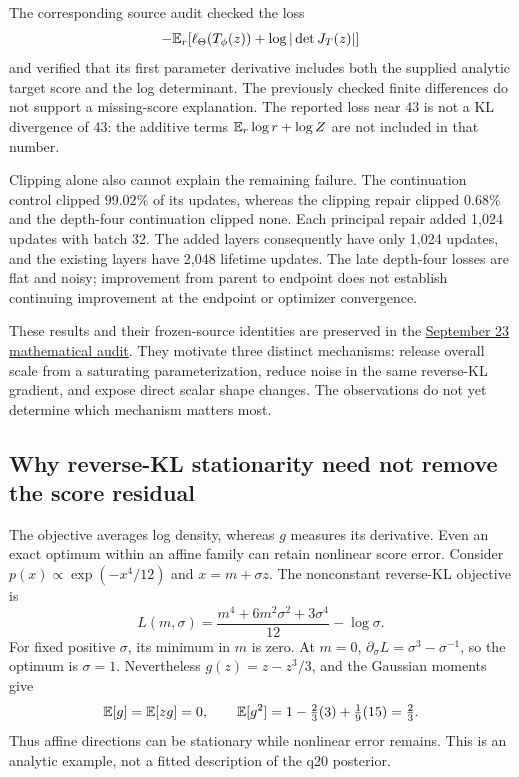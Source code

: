 The corresponding source audit checked the loss
\begin{equation}
 -\mathbb{E}_r[\ell_\Theta(T_\phi(z))+\log|\det J_T(z)|]
\end{equation}
and verified that its first
parameter derivative includes both the supplied analytic target score and
the log determinant. The previously checked finite differences do not support
a missing-score explanation. The reported loss near 43 is not a KL divergence
of 43: the additive terms $\mathbb{E}_r\log r+\log Z$ are not included in that number.

Clipping alone also cannot explain the remaining failure. The continuation
control clipped $99.02\%$ of its updates, whereas the clipping repair clipped
$0.68\%$ and the depth-four continuation clipped none. Each principal repair
added 1,024 updates with batch 32. The added layers consequently have only
1,024 updates, and the existing layers have 2,048 lifetime updates. The late
depth-four losses are flat and noisy; improvement from parent to endpoint does
not establish continuing improvement at the endpoint or optimizer convergence.

These results and their frozen-source identities are preserved in the
\href{../plans/bayesfilter-q20-training-math-audit-results-2026-09-23.md}{September 23 mathematical audit}.
They motivate three distinct mechanisms: release overall scale from a
saturating parameterization, reduce noise in the same reverse-KL gradient,
and expose direct scalar shape changes. The observations do not yet determine
which mechanism matters most.

\subsection{Why reverse-KL stationarity need not remove the score residual}

The objective averages log density, whereas $g$ measures its derivative.
Even an exact optimum within an affine family can retain nonlinear score
error. Consider $p(x)\propto\exp(-x^4/12)$ and $x=m+\sigma z$. The
nonconstant reverse-KL objective is
\begin{equation}
 L(m,\sigma)=\frac{m^4+6m^2\sigma^2+3\sigma^4}{12}-\log\sigma.
\end{equation}
For fixed positive $\sigma$, its minimum in $m$ is zero. At $m=0$,
$\partial_\sigma L=\sigma^3-\sigma^{-1}$, so the optimum is $\sigma=1$.
Nevertheless $g(z)=z-z^3/3$, and the Gaussian moments give
\begin{equation}
 \mathbb{E}[g]=\mathbb{E}[zg]=0,\qquad
 \mathbb{E}[g^2]=1-\tfrac23(3)+\tfrac19(15)=\tfrac23.
\end{equation}
Thus affine directions can be stationary while nonlinear error remains. This
is an analytic example, not a fitted description of the q20 posterior.


